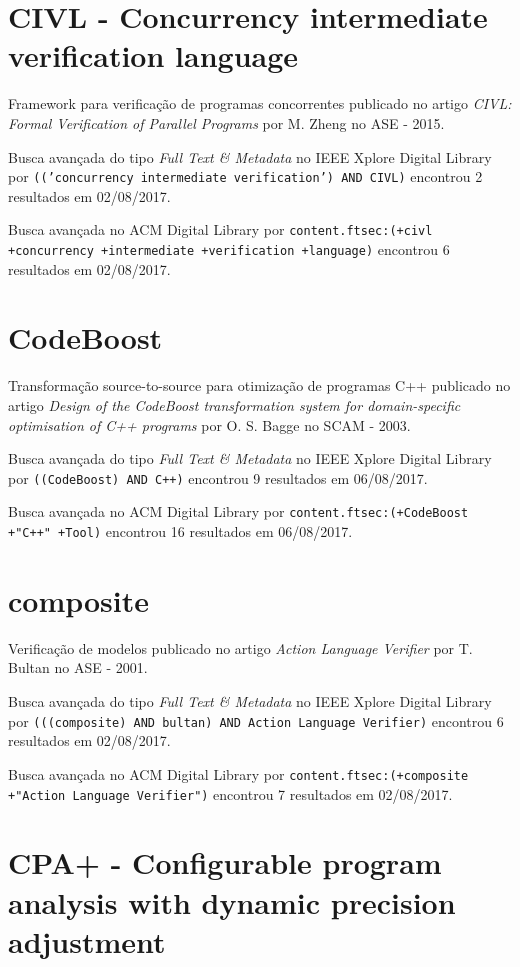 \section{CIVL - Concurrency intermediate verification language}

Framework para verificação de programas concorrentes
publicado no artigo
{\it CIVL: Formal Verification of Parallel Programs}
por
M. Zheng
no
ASE
-
2015.

Busca avançada do tipo {\it Full Text \& Metadata} no IEEE Xplore Digital Library por
\texttt{(('concurrency intermediate verification') AND CIVL)}
encontrou
2 resultados em
02/08/2017.

Busca avançada no ACM Digital Library por
\texttt{content.ftsec:(+civl +concurrency +intermediate +verification +language)}
encontrou
6 resultados em
02/08/2017.

\section{CodeBoost}

Transformação source-to-source para otimização de programas C++
publicado no artigo
{\it Design of the CodeBoost transformation system for domain-specific optimisation of C++ programs}
por
O. S. Bagge
no
SCAM
-
2003.

Busca avançada do tipo {\it Full Text \& Metadata} no IEEE Xplore Digital Library por
\texttt{((CodeBoost) AND C++)}
encontrou
9 resultados em
06/08/2017.

Busca avançada no ACM Digital Library por
\texttt{content.ftsec:(+CodeBoost +"C++" +Tool)}
encontrou
16 resultados em
06/08/2017.

\section{composite}

Verificação de modelos
publicado no artigo
{\it Action Language Verifier}
por
T. Bultan
no
ASE
-
2001.

Busca avançada do tipo {\it Full Text \& Metadata} no IEEE Xplore Digital Library por
\texttt{(((composite) AND bultan) AND Action Language Verifier)}
encontrou
6 resultados em
02/08/2017.

Busca avançada no ACM Digital Library por
\texttt{content.ftsec:(+composite +"Action Language Verifier")}
encontrou
7 resultados em
02/08/2017.

\section{CPA+ - Configurable program analysis with dynamic precision adjustment}


